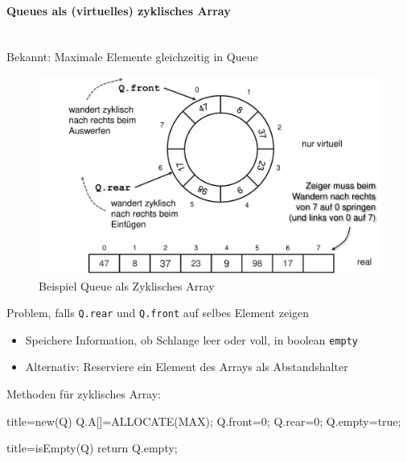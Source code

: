 \documentclass[
    ngerman,
    color=3b,
    load_common, %
    summary,
    boxarc,
]{tuda_summary}
\begin{document}
\paragraph{Queues als (virtuelles) zyklisches Array}\mbox{}\\
Bekannt: Maximale Elemente gleichzeitig in Queue
\begin{figure}[ht]
    \centering
    \includegraphics[width=12cm]{pictures/queueZyklisch.pdf}
    \caption{Beispiel Queue als Zyklisches Array}
\end{figure}

Problem, falls \texttt{Q.rear} und \texttt{Q.front} auf selbes Element zeigen
\begin{itemize}
    \item Speichere Information, ob Schlange leer oder voll, in boolean \texttt{empty}
    \item Alternativ: Reserviere ein Element des Arrays als Abstandshalter
\end{itemize}

Methoden für zyklisches Array:\\
\begin{minipage}[t]{.49\textwidth}\mbox{}
    \begin{codeBlock}[autogobble]{title={new(Q)}}
        Q.A[]=ALLOCATE(MAX);
        Q.front=0;
        Q.rear=0;
        Q.empty=true;
    \end{codeBlock}
\end{minipage}
\begin{minipage}[t]{.5\textwidth}\mbox{}
    \begin{codeBlock}[autogobble]{title={isEmpty(Q)}}
        return Q.empty;
    \end{codeBlock}
\end{minipage}
\end{document}
